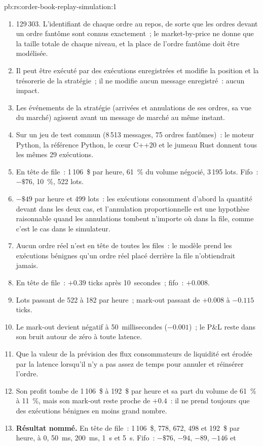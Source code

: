 \begin{solution}{pb:rs:order-book-replay-simulation:1}
\begin{enumerate}
\item 129\,303. L'identifiant de chaque ordre au repos, de sorte que les ordres devant un ordre fantôme sont connus exactement~; le market-by-price ne donne que la taille totale de chaque niveau, et la
place de l'ordre fantôme doit être modélisée.
\item Il peut être exécuté par des exécutions enregistrées et modifie la position et la trésorerie de la stratégie~; il ne modifie aucun message enregistré~: aucun impact.
\item Les événements de la stratégie (arrivées et annulations de ses ordres, sa vue du marché) agissent avant un message de marché au même instant.
\item Sur un jeu de test commun (8\,513 messages, 75 ordres fantômes)~: le moteur Python, la référence Python, le cœur C++20 et le jumeau Rust donnent tous les mêmes 29 exécutions.
\item En tête de file~: 1\,106~\$ par heure, 61~\% du volume négocié, 3\,195 lots. Fifo~: $-\$76$, 10~\%, 522 lots.
\item $-\$49$ par heure et 499 lots~: les exécutions consomment d'abord la quantité devant dans les deux cas, et l'annulation proportionnelle est une hypothèse raisonnable quand les annulations
tombent n'importe où dans la file, comme c'est le cas dans le simulateur.
\item Aucun ordre réel n'est en tête de toutes les files~: le modèle prend les exécutions bénignes qu'un ordre réel placé derrière la file n'obtiendrait jamais.
\item En tête de file~: $+0.39$ ticks après 10~secondes~; fifo~: $+0.008$.
\item Lots passant de 522 à 182 par heure~; mark-out passant de $+0.008$ à $-0.115$ ticks.
\item Le mark-out devient négatif à 50~millisecondes ($-0.001$)~; le P\&L reste dans son bruit autour de zéro à toute latence.
\item Que la valeur de la prévision des flux consommateurs de liquidité est érodée par la latence lorsqu'il n'y a pas assez de temps pour annuler et réinsérer l'ordre.
\item Son profit tombe de 1\,106~\$ à 192~\$ par heure et sa part du volume de 61~\% à 11~\%, mais son mark-out reste proche de $+0.4$~: il ne prend toujours que des exécutions bénignes
en moins grand nombre.
\item \textbf{Résultat nommé.} En tête de file~: 1\,106~\$, 778, 672, 498 et 192~\$ par heure, à 0, 50~ms, 200~ms, 1~s et 5~s. Fifo~: $-\$76$, $-94$, $-89$, $-146$ et

\end{enumerate}
\end{solution}
